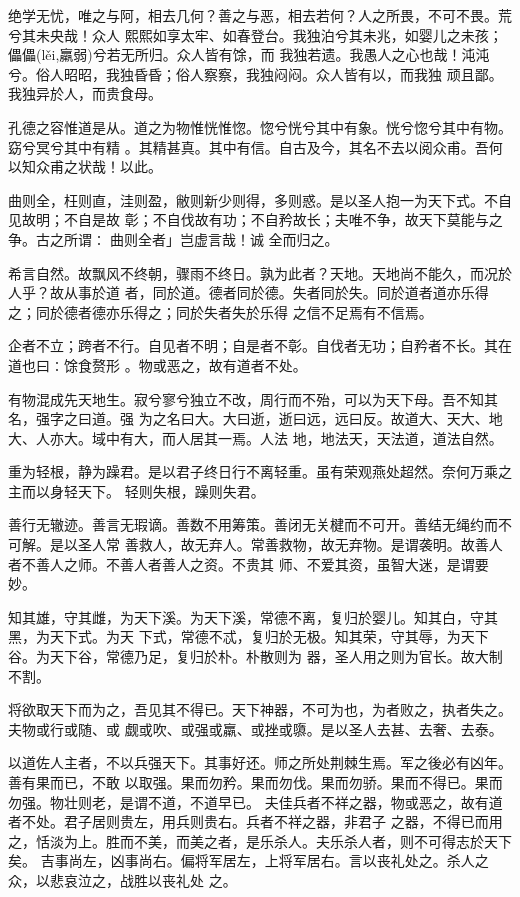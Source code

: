 \documentclass[a4paper, twoside, openany, extrafontsizes]{dlutthesis}
\begin{document}
绝学无忧，唯之与阿，相去几何？善之与恶，相去若何？人之所畏，不可不畏。荒兮其未央哉！众人
熙熙如享太牢、如春登台。我独泊兮其未兆，如婴儿之未孩；儡儡(lěi,羸弱)兮若无所归。众人皆有馀，而
我独若遗。我愚人之心也哉！沌沌兮。俗人昭昭，我独昏昏；俗人察察，我独闷闷。众人皆有以，而我独
顽且鄙。我独异於人，而贵食母。

孔德之容惟道是从。道之为物惟恍惟惚。惚兮恍兮其中有象。恍兮惚兮其中有物。窈兮冥兮其中有精
。其精甚真。其中有信。自古及今，其名不去以阅众甫。吾何以知众甫之状哉！以此。

曲则全，枉则直，洼则盈，敝则新少则得，多则惑。是以圣人抱一为天下式。不自见故明；不自是故
彰；不自伐故有功；不自矜故长；夫唯不争，故天下莫能与之争。古之所谓∶曲则全者」岂虚言哉！诚
全而归之。

希言自然。故飘风不终朝，骤雨不终日。孰为此者？天地。天地尚不能久，而况於人乎？故从事於道
者，同於道。德者同於德。失者同於失。同於道者道亦乐得之；同於德者德亦乐得之；同於失者失於乐得
之信不足焉有不信焉。

企者不立；跨者不行。自见者不明；自是者不彰。自伐者无功；自矜者不长。其在道也曰∶馀食赘形
。物或恶之，故有道者不处。

有物混成先天地生。寂兮寥兮独立不改，周行而不殆，可以为天下母。吾不知其名，强字之曰道。强
为之名曰大。大曰逝，逝曰远，远曰反。故道大、天大、地大、人亦大。域中有大，而人居其一焉。人法
地，地法天，天法道，道法自然。

重为轻根，静为躁君。是以君子终日行不离轻重。虽有荣观燕处超然。奈何万乘之主而以身轻天下。
轻则失根，躁则失君。

善行无辙迹。善言无瑕谪。善数不用筹策。善闭无关楗而不可开。善结无绳约而不可解。是以圣人常
善救人，故无弃人。常善救物，故无弃物。是谓袭明。故善人者不善人之师。不善人者善人之资。不贵其
师、不爱其资，虽智大迷，是谓要妙。

知其雄，守其雌，为天下溪。为天下溪，常德不离，复归於婴儿。知其白，守其黑，为天下式。为天
下式，常德不忒，复归於无极。知其荣，守其辱，为天下谷。为天下谷，常德乃足，复归於朴。朴散则为
器，圣人用之则为官长。故大制不割。

将欲取天下而为之，吾见其不得已。天下神器，不可为也，为者败之，执者失之。夫物或行或随、或
觑或吹、或强或羸、或挫或隳。是以圣人去甚、去奢、去泰。

以道佐人主者，不以兵强天下。其事好还。师之所处荆棘生焉。军之後必有凶年。善有果而已，不敢
以取强。果而勿矜。果而勿伐。果而勿骄。果而不得已。果而勿强。物壮则老，是谓不道，不道早已。
夫佳兵者不祥之器，物或恶之，故有道者不处。君子居则贵左，用兵则贵右。兵者不祥之器，非君子
之器，不得已而用之，恬淡为上。胜而不美，而美之者，是乐杀人。夫乐杀人者，则不可得志於天下矣。
吉事尚左，凶事尚右。偏将军居左，上将军居右。言以丧礼处之。杀人之众，以悲哀泣之，战胜以丧礼处
之。
\end{document}
